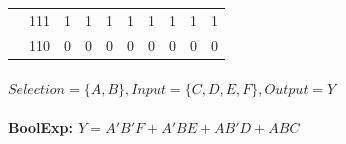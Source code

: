 \documentclass{report}
\begin{document}
\begin{table}[h]
\begin{tabular}{|c|l|c|c|c|c|c|c|c|c|}
                                                & 111       & 1                        & 1                        & 1                        & 1                        & 1                        & 1                        & 1                        & 1                        \\ \cline{2-10} 
                                                & 110       & 0                        & 0                        & 0                        & 0                        & 0                        & 0                        & 0                        & 0                        \\ \hline
                    \end{tabular}
                \end{table}


                \paragraph{$ Selection=\{A, B\}, Input=\{C, D, E, F\}, Output=Y $}
                \paragraph{BoolExp: $ Y = A'B'F + A'BE + AB'D + ABC $}
            
            \newpage
\end{document}
